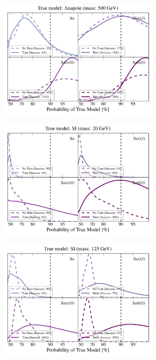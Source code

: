 \documentclass[11pt]{article}
\begin{document}
\begin{figure}
\centering
\includegraphics[width=0.7\textwidth]{plots/PDF_500GeV_Anapole_50sims_Xe_Xe3x_Xe10x_XeG3_GF_TNT.pdf}
\caption{\label{fig:500gev_anapole_XeFull_TNT_GF}}
\end{figure}

\begin{figure}
\centering
\includegraphics[width=0.7\textwidth]{plots/PDF_20GeV_SI_Higgs_50sims_Xe_Xe3x_Xe10x_XeG3_GF_TNT.pdf}
\caption{\label{fig:500gev_anapole_XeFull_TNT_GF}}
\end{figure}

\begin{figure}
\centering
\includegraphics[width=0.7\textwidth]{plots/PDF_125GeV_SI_Higgs_50sims_Xe_Xe3x_Xe10x_XeG3_GF_TNT.pdf}
\caption{\label{fig:500gev_anapole_XeFull_TNT_GF}}
\end{figure}
\end{document}
